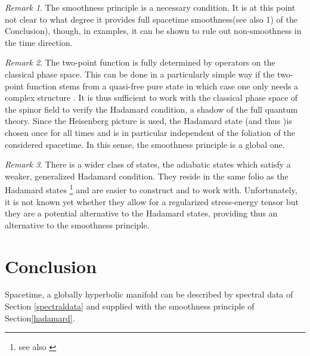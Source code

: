 \documentclass[a4paper,10pt,oneside]{amsart}
\theoremstyle{plain}
\theoremstyle{definition}
\theoremstyle{remark}
\newtheorem{remark}{Remark}
\begin{document}
\begin{remark}
The smoothness principle is a necessary condition. It is at this
point not clear to what degree it provides full spacetime
smoothness(see also 1) of the Conclusion), though, in examples, it
can be shown to rule out non-smoothness in the time direction.
\end{remark}
\begin{remark}

  The two-point function is fully determined by operators on the
  classical phase space. This can be done in a particularly simple
  way if the two-point function stems from a quasi-free pure state
  \myHighlight{$\omega$}\coordHE{} in which case one only needs a complex structure
  \coordHE{}. It is thus sufficient to work with the classical
  phase space of the spinor field to verify the Hadamard
  condition, a shadow of the full quantum theory. Since the
  Heisenberg picture is used, the Hadamard state \myHighlight{$\omega$}\coordHE{} (and thus
  \coordHE{})is chosen once for all times and is in particular
  independent of the foliation of the considered spacetime. In
  this sense, the smoothness principle is a global one.
\end{remark}

\begin{remark}
  There is a wider class of states, the adiabatic states
  \cite{Parker1969,Deutsch-Najmi,Lueders-Roberts1990,Junker,
  Wellmann,Hollands1999a,Hollands1999b}
  which
  satisfy a weaker, generalized Hadamard condition. They reside  in
  the same folio as the Hadamard states \cite{Junkerprivate}
  \footnote{ see also \cite{Junker-Schrohe}} and
  are easier to construct and to work with. Unfortunately, it is
  not known yet whether they allow for a regularized stress-energy
  tensor but they are a potential alternative to the Hadamard states,
  providing thus an alternative to the smoothness principle.
\end{remark}



\section{Conclusion}



Spacetime, a globally hyperbolic manifold  can be described by
spectral data \coordHE{}
of Section \ref{spectraldata} and supplied with the smoothness
principle of Section\ref{hadamard}.
\end{document}
